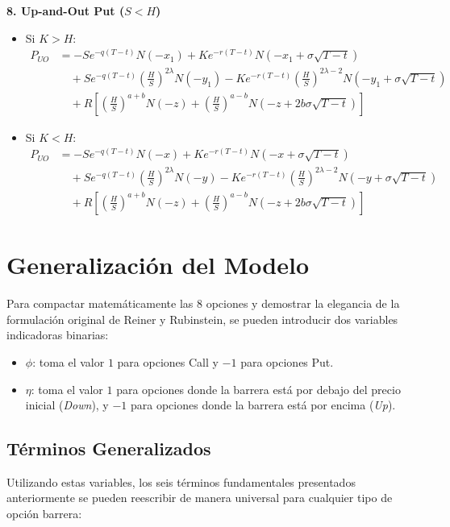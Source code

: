 \textbf{8. Up-and-Out Put ($S < H$)}
\begin{itemize}
    \item Si $K > H$:
    \begin{align*}
    P_{UO} &= -S e^{-q(T-t)} N(-x_1) + K e^{-r(T-t)} N(-x_1 + \sigma\sqrt{T-t}) \\
    &\quad + S e^{-q(T-t)} \left(\frac{H}{S}\right)^{2\lambda} N(-y_1) - K e^{-r(T-t)} \left(\frac{H}{S}\right)^{2\lambda - 2} N(-y_1 + \sigma\sqrt{T-t}) \\
    &\quad + R \left[ \left(\frac{H}{S}\right)^{a+b} N(-z) + \left(\frac{H}{S}\right)^{a-b} N(-z + 2b\sigma\sqrt{T-t}) \right]
    \end{align*}
    \item Si $K < H$:
    \begin{align*}
    P_{UO} &= -S e^{-q(T-t)} N(-x) + K e^{-r(T-t)} N(-x + \sigma\sqrt{T-t}) \\
    &\quad + S e^{-q(T-t)} \left(\frac{H}{S}\right)^{2\lambda} N(-y) - K e^{-r(T-t)} \left(\frac{H}{S}\right)^{2\lambda - 2} N(-y + \sigma\sqrt{T-t}) \\
    &\quad + R \left[ \left(\frac{H}{S}\right)^{a+b} N(-z) + \left(\frac{H}{S}\right)^{a-b} N(-z + 2b\sigma\sqrt{T-t}) \right]
    \end{align*}
\end{itemize}


\section{Generalización del Modelo}

Para compactar matemáticamente las 8 opciones y demostrar la elegancia de la formulación original de Reiner y Rubinstein, se pueden introducir dos variables indicadoras binarias:
\begin{itemize}
    \item $\phi$: toma el valor $1$ para opciones Call y $-1$ para opciones Put.
    \item $\eta$: toma el valor $1$ para opciones donde la barrera está por debajo del precio inicial (\textit{Down}), y $-1$ para opciones donde la barrera está por encima (\textit{Up}).
\end{itemize}

\subsection{Términos Generalizados}
Utilizando estas variables, los seis términos fundamentales presentados anteriormente se pueden reescribir de manera universal para cualquier tipo de opción barrera:

